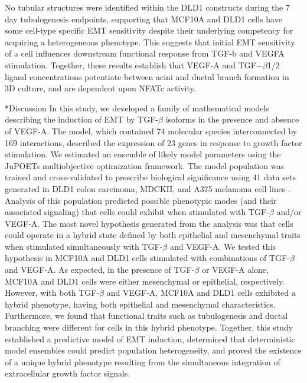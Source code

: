\documentclass[12pt]{article}
\makeatletter
\renewcommand\section{\@startsection
	{subsection}{2}{0mm}
	{-0.2in}
	{0.05\baselineskip}
	{\normalfont\large\bfseries}}
\makeatother
\begin{document}
No tubular structures were identified within the DLD1 constructs during the 7 day tubulogenesis endpoints, supporting that MCF10A and DLD1 cells have some cell-type specific EMT sensitivity despite their underlying competency for acquiring a heterogeneous phenotype. This suggests that initial EMT sensitivity of a cell influences downstream functional response from TGF-b and VEGFA stimulation.
Together, these results establish that VEGF-A and TGF$-\beta$1/2 ligand concentrations potentiate between acini and ductal branch formation in 3D culture, and are dependent upon NFATc activity.


\clearpage

\section*{Discussion}
In this study, we developed a family of mathematical models describing the induction of EMT by TGF-$\beta$ isoforms in the presence and absence of VEGF-A.
The model, which contained 74 molecular species interconnected by 169 interactions,
described the expression of 23 genes in response to growth factor stimulation.
We estimated an ensemble of likely model parameters using the JuPOETs multiobjective optimization framework.
The model population was trained and cross-validated to prescribe biological significance using 41 data sets generated in DLD1 colon carcinoma, MDCKII, and A375 melanoma cell lines \citep{Medici:2008fk}.
Analysis of this population predicted possible phenotypic modes (and their associated signaling) that cells could exhibit when stimulated with TGF-$\beta$ and/or VEGF-A.
The most novel hypothesis generated from the analysis was that cells could operate in a hybrid state defined by both epithelial and mesenchymal traits when stimulated simultaneously with TGF-$\beta$ and VEGF-A.
We tested this hypothesis in MCF10A and DLD1 cells stimulated with combinations of TGF-$\beta$ and VEGF-A.
As expected, in the presence of TGF-$\beta$ or VEGF-A alone, MCF10A and DLD1 cells were either mesenchymal or epithelial, respectively.
However, with both TGF-$\beta$ and VEGF-A, MCF10A and DLD1 cells exhibited a hybrid phenotype, having both epithelial and mesenchymal characteristics.
Furthermore, we found that functional traits such as tubulogenesis and ductal branching were different for cells in this hybrid phenotype.
Together, this study established a predictive model of EMT induction, determined that deterministic model ensembles could predict population heterogeneity, and proved the existence of a unique hybrid phenotype resulting from the simultaneous integration of extracellular growth factor signals.
\end{document}
